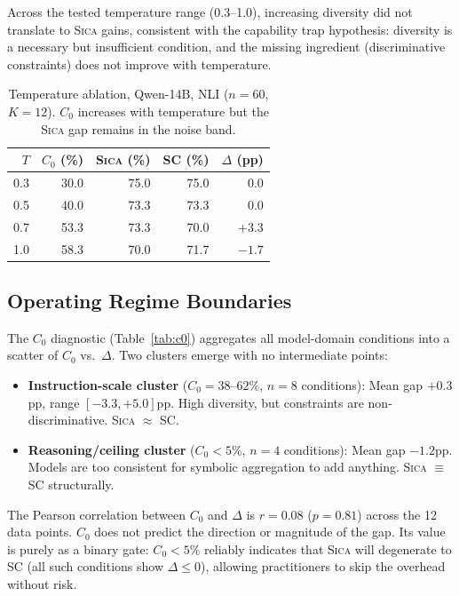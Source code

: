 \documentclass[11pt,a4paper]{article}
\newcommand{\sica}{\textsc{Sica}}
\newcommand{\czero}{C_0}
\begin{document}
Across the tested temperature range (0.3--1.0), increasing diversity did not translate to \sica{} gains, consistent with the capability trap hypothesis: diversity is a necessary but insufficient condition, and the missing ingredient (discriminative constraints) does not improve with temperature.

\begin{table}[t]
\centering
\caption{Temperature ablation, Qwen-14B, NLI ($n = 60$, $K = 12$). $\czero$ increases with temperature but the \sica{} gap remains in the noise band.}
\label{tab:temp}
\small
\begin{tabular}{rrrrr}
\toprule
\textbf{$T$} & \textbf{$\czero$ (\%)} & \textbf{\sica{} (\%)} & \textbf{SC (\%)} & \textbf{$\Delta$ (pp)} \\
\midrule
0.3 & 30.0 & 75.0 & 75.0 & 0.0 \\
0.5 & 40.0 & 73.3 & 73.3 & 0.0 \\
0.7 & 53.3 & 73.3 & 70.0 & +3.3 \\
1.0 & 58.3 & 70.0 & 71.7 & $-1.7$ \\
\bottomrule
\end{tabular}
\end{table}

\subsection{Operating Regime Boundaries}

The $\czero$ diagnostic (Table~\ref{tab:c0}) aggregates all model-domain conditions into a scatter of $\czero$ vs.\ $\Delta$. Two clusters emerge with no intermediate points:

\begin{itemize}[nosep]
  \item \textbf{Instruction-scale cluster} ($\czero = 38$--$62\%$, $n = 8$ conditions): Mean gap $+0.3$pp, range $[-3.3, +5.0]$pp. High diversity, but constraints are non-discriminative. \sica{} $\approx$ SC.
  \item \textbf{Reasoning/ceiling cluster} ($\czero < 5\%$, $n = 4$ conditions): Mean gap $-1.2$pp. Models are too consistent for symbolic aggregation to add anything. \sica{} $\equiv$ SC structurally.
\end{itemize}

The Pearson correlation between $\czero$ and $\Delta$ is $r = 0.08$ ($p = 0.81$) across the 12 data points. $\czero$ does not predict the direction or magnitude of the gap. Its value is purely as a binary gate: $\czero < 5\%$ reliably indicates that \sica{} will degenerate to SC (all such conditions show $\Delta \leq 0$), allowing practitioners to skip the overhead without risk.
\end{document}
